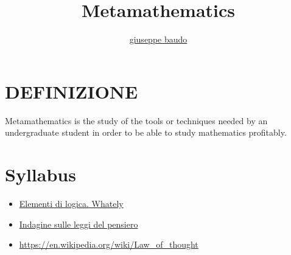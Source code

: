 \documentclass[a4paper,10pt]{article}
\title{Metamathematics}
\author{\href{http://www.baudo.hol.es}{giuseppe baudo}}
\begin{document}
\maketitle

\section{DEFINIZIONE}
Metamathematics is the study of the tools or techniques needed by an undergraduate student in order to be able to study mathematics profitably. 

\section{Syllabus}
\begin{itemize}
 \item \href{./ElementiDiLogicaWhately.html}{Elementi di logica. Whately}
 \item \href{./IndagineLeggiPensiero.html}{Indagine sulle leggi del pensiero}
 \item \url{https://en.wikipedia.org/wiki/Law_of_thought}
\end{itemize}
\end{document}
